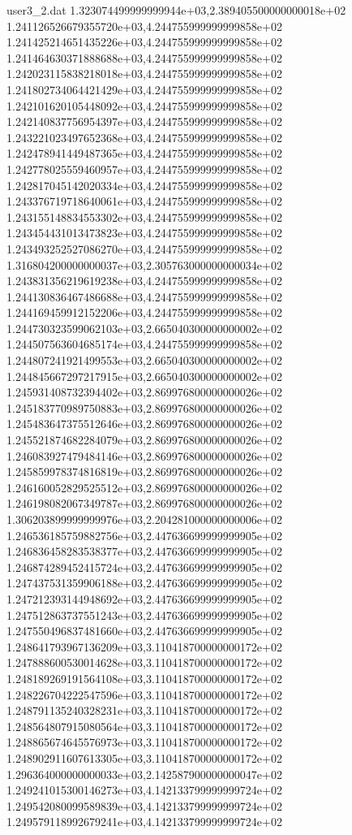 \begin{filecontents}{user3_2.dat}
1.323074499999999944e+03,2.389405500000000018e+02
1.241126526679355720e+03,4.244755999999999858e+02
1.241425214651435226e+03,4.244755999999999858e+02
1.241464630371888688e+03,4.244755999999999858e+02
1.242023115838218018e+03,4.244755999999999858e+02
1.241802734064421429e+03,4.244755999999999858e+02
1.242101620105448092e+03,4.244755999999999858e+02
1.242140837756954397e+03,4.244755999999999858e+02
1.243221023497652368e+03,4.244755999999999858e+02
1.242478941449487365e+03,4.244755999999999858e+02
1.242778025559460957e+03,4.244755999999999858e+02
1.242817045142020334e+03,4.244755999999999858e+02
1.243376719718640061e+03,4.244755999999999858e+02
1.243155148834553302e+03,4.244755999999999858e+02
1.243454431013473823e+03,4.244755999999999858e+02
1.243493252527086270e+03,4.244755999999999858e+02
1.316804200000000037e+03,2.305763000000000034e+02
1.243831356219619238e+03,4.244755999999999858e+02
1.244130836467486688e+03,4.244755999999999858e+02
1.244169459912152206e+03,4.244755999999999858e+02
1.244730323599062103e+03,2.665040300000000002e+02
1.244507563604685174e+03,4.244755999999999858e+02
1.244807241921499553e+03,2.665040300000000002e+02
1.244845667297217915e+03,2.665040300000000002e+02
1.245931408732394402e+03,2.869976800000000026e+02
1.245183770989750883e+03,2.869976800000000026e+02
1.245483647375512646e+03,2.869976800000000026e+02
1.245521874682284079e+03,2.869976800000000026e+02
1.246083927479484146e+03,2.869976800000000026e+02
1.245859978374816819e+03,2.869976800000000026e+02
1.246160052829525512e+03,2.869976800000000026e+02
1.246198082067349787e+03,2.869976800000000026e+02
1.306203899999999976e+03,2.204281000000000006e+02
1.246536185759882756e+03,2.447636699999999905e+02
1.246836458283538377e+03,2.447636699999999905e+02
1.246874289452415724e+03,2.447636699999999905e+02
1.247437531359906188e+03,2.447636699999999905e+02
1.247212393144948692e+03,2.447636699999999905e+02
1.247512863737551243e+03,2.447636699999999905e+02
1.247550496837481660e+03,2.447636699999999905e+02
1.248641793967136209e+03,3.110418700000000172e+02
1.247888600530014628e+03,3.110418700000000172e+02
1.248189269191564108e+03,3.110418700000000172e+02
1.248226704222547596e+03,3.110418700000000172e+02
1.248791135240328231e+03,3.110418700000000172e+02
1.248564807915080564e+03,3.110418700000000172e+02
1.248865674645576973e+03,3.110418700000000172e+02
1.248902911607613305e+03,3.110418700000000172e+02
1.296364000000000033e+03,2.142587900000000047e+02
1.249241015300146273e+03,4.142133799999999724e+02
1.249542080099589839e+03,4.142133799999999724e+02
1.249579118992679241e+03,4.142133799999999724e+02

\end{filecontents}
